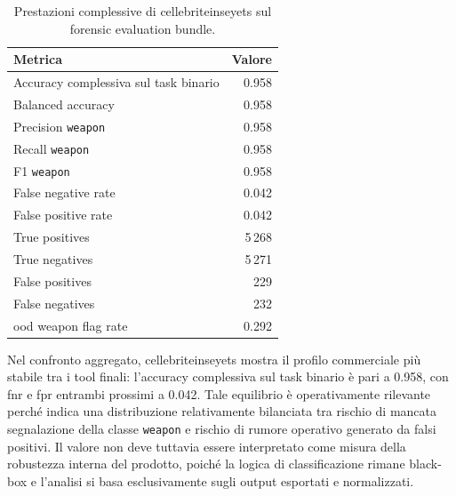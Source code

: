 \begin{table}[H]
\centering
\caption{Prestazioni complessive di \gls{cellebriteinseyets} sul forensic evaluation bundle.}
\label{tab:results-cellebrite-global-metrics}
\small
\begin{tabular}{lr}
\toprule
\textbf{Metrica} & \textbf{Valore} \\
\midrule
Accuracy complessiva sul task binario & 0.958 \\
Balanced accuracy & 0.958 \\
Precision \texttt{weapon} & 0.958 \\
Recall \texttt{weapon} & 0.958 \\
F1 \texttt{weapon} & 0.958 \\
False negative rate & 0.042 \\
False positive rate & 0.042 \\
True positives & 5\,268 \\
True negatives & 5\,271 \\
False positives & 229 \\
False negatives & 232 \\
\gls{ood} weapon flag rate & 0.292 \\
\bottomrule
\end{tabular}
\end{table}

Nel confronto aggregato, \gls{cellebriteinseyets} mostra il profilo commerciale
più stabile tra i tool finali: l'accuracy complessiva sul task binario è pari a
0.958, con \gls{fnr} e \gls{fpr} entrambi prossimi a 0.042. Tale equilibrio è
operativamente rilevante perché indica una distribuzione relativamente bilanciata
tra rischio di mancata segnalazione della classe \texttt{weapon} e rischio di
rumore operativo generato da falsi positivi. Il valore non deve tuttavia essere
interpretato come misura della robustezza interna del prodotto, poiché la logica
di classificazione rimane black-box e l'analisi si basa esclusivamente sugli
output esportati e normalizzati.

